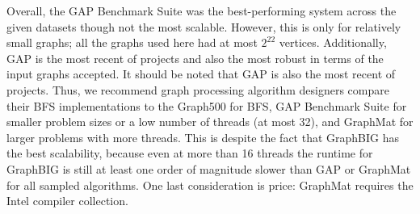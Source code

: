 \documentclass[conference]{IEEEtran}
\begin{document}
Overall, the GAP Benchmark Suite was the best-performing system across the given datasets though not the most scalable. However, this is only for relatively small graphs; all the graphs used here had at most $2^{22}$ vertices. Additionally, GAP is the most recent of projects and also the most robust in terms of the input graphs accepted. It should be noted that GAP is also the most recent of projects. Thus, we recommend graph processing algorithm designers compare their BFS implementations to the Graph500 for BFS, GAP Benchmark Suite for smaller problem sizes or a low number of threads (at most 32), and GraphMat for larger problems with more threads. This is despite the fact that GraphBIG has the best scalability, because even at more than 16 threads the runtime for GraphBIG is still at least one order of magnitude slower than GAP or GraphMat for all sampled algorithms. One last consideration is price: GraphMat requires the Intel compiler collection.



\end{document}
